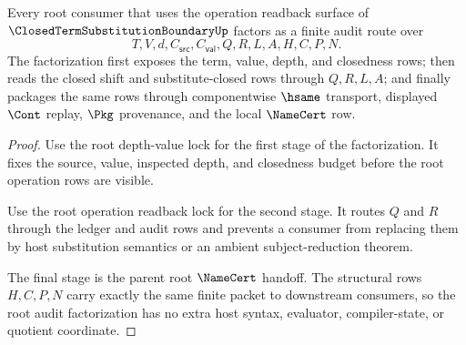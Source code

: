 \begin{theorem}
\label{thm:closed-term-substitution-boundary-root-consumer-audit-factorization}
Every root consumer that uses the operation readback surface of $\ClosedTermSubstitutionBoundaryUp$ factors as a finite audit route over
$$
T,V,d,C_{\mathsf{src}},C_{\mathsf{val}},Q,R,L,A,H,C,P,N.
$$
The factorization first exposes the term, value, depth, and closedness rows; then reads the closed shift and substitute-closed rows through $Q,R,L,A$; and finally packages the same rows through componentwise $\hsame$ transport, displayed $\Cont$ replay, $\Pkg$ provenance, and the local $\NameCert$ row.
\end{theorem}
\begin{proof}
Use the root depth-value lock for the first stage of the factorization. It fixes the source, value, inspected depth, and closedness budget before the root operation rows are visible.

Use the root operation readback lock for the second stage. It routes $Q$ and $R$ through the ledger and audit rows and prevents a consumer from replacing them by host substitution semantics or an ambient subject-reduction theorem.

The final stage is the parent root $\NameCert$ handoff. The structural rows $H,C,P,N$ carry exactly the same finite packet to downstream consumers, so the root audit factorization has no extra host syntax, evaluator, compiler-state, or quotient coordinate.
\end{proof}

